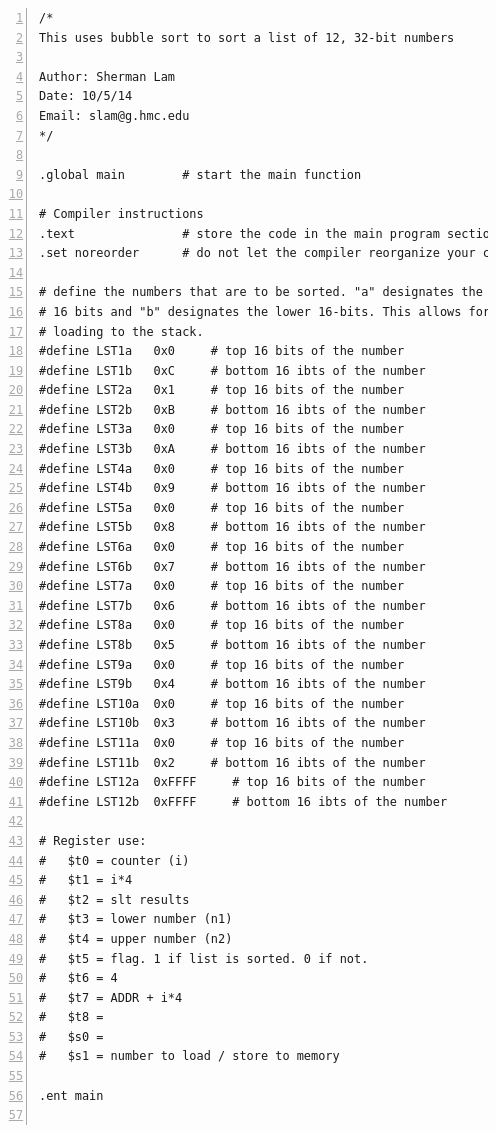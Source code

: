 \documentclass[11pt]{article}
\begin{document}
\begin{lstlisting}[numbers=left,basicstyle=\footnotesize]
/*
This uses bubble sort to sort a list of 12, 32-bit numbers

Author: Sherman Lam
Date: 10/5/14
Email: slam@g.hmc.edu
*/

.global main        # start the main function

# Compiler instructions
.text               # store the code in the main program section of RAM
.set noreorder      # do not let the compiler reorganize your code

# define the numbers that are to be sorted. "a" designates the upper
# 16 bits and "b" designates the lower 16-bits. This allows for easy
# loading to the stack.
#define LST1a   0x0     # top 16 bits of the number
#define LST1b   0xC     # bottom 16 ibts of the number
#define LST2a   0x1     # top 16 bits of the number
#define LST2b   0xB     # bottom 16 ibts of the number
#define LST3a   0x0     # top 16 bits of the number
#define LST3b   0xA     # bottom 16 ibts of the number
#define LST4a   0x0     # top 16 bits of the number
#define LST4b   0x9     # bottom 16 ibts of the number
#define LST5a   0x0     # top 16 bits of the number
#define LST5b   0x8     # bottom 16 ibts of the number
#define LST6a   0x0     # top 16 bits of the number
#define LST6b   0x7     # bottom 16 ibts of the number
#define LST7a   0x0     # top 16 bits of the number
#define LST7b   0x6     # bottom 16 ibts of the number
#define LST8a   0x0     # top 16 bits of the number
#define LST8b   0x5     # bottom 16 ibts of the number
#define LST9a   0x0     # top 16 bits of the number
#define LST9b   0x4     # bottom 16 ibts of the number
#define LST10a  0x0     # top 16 bits of the number
#define LST10b  0x3     # bottom 16 ibts of the number
#define LST11a  0x0     # top 16 bits of the number
#define LST11b  0x2     # bottom 16 ibts of the number
#define LST12a  0xFFFF     # top 16 bits of the number
#define LST12b  0xFFFF     # bottom 16 ibts of the number

# Register use:
#   $t0 = counter (i)
#   $t1 = i*4
#   $t2 = slt results
#   $t3 = lower number (n1)
#   $t4 = upper number (n2)
#   $t5 = flag. 1 if list is sorted. 0 if not.
#   $t6 = 4
#   $t7 = ADDR + i*4
#   $t8 = 
#   $s0 = 
#   $s1 = number to load / store to memory

.ent main


\end{lstlisting}
\end{document}
